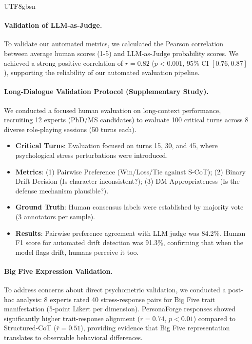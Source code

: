\documentclass[11pt]{article}
\begin{document}
\begin{CJK*}{UTF8}{gbsn}
\paragraph{Validation of LLM-as-Judge.} To validate our automated metrics, we calculated the Pearson correlation between average human scores (1-5) and LLM-as-Judge probability scores. We achieved a strong positive correlation of \textbf{$r=0.82$} ($p < 0.001$, 95\% CI $[0.76, 0.87]$), supporting the reliability of our automated evaluation pipeline.

\paragraph{Long-Dialogue Validation Protocol (Supplementary Study).}
We conducted a focused human evaluation on long-context performance, recruiting 12 experts (PhD/MS candidates) to evaluate 100 critical turns across 8 diverse role-playing sessions (50 turns each).
\begin{itemize}
    \item \textbf{Critical Turns}: Evaluation focused on turns 15, 30, and 45, where psychological stress perturbations were introduced.
    \item \textbf{Metrics}: (1) Pairwise Preference (Win/Loss/Tie against S-CoT); (2) Binary Drift Decision (Is character inconsistent?); (3) DM Appropriateness (Is the defense mechanism plausible?).
    \item \textbf{Ground Truth}: Human consensus labels were established by majority vote (3 annotators per sample).
    \item \textbf{Results}: Pairwise preference agreement with LLM judge was 84.2\%. Human F1 score for automated drift detection was 91.3\%, confirming that when the model flags drift, humans perceive it too.
\end{itemize}

\paragraph{Big Five Expression Validation.} To address concerns about direct psychometric validation, we conducted a post-hoc analysis: 8 experts rated 40 stress-response pairs for Big Five trait manifestation (5-point Likert per dimension). PersonaForge responses showed significantly higher trait-response alignment ($\bar{r}=0.74$, $p<0.01$) compared to Structured-CoT ($\bar{r}=0.51$), providing evidence that Big Five representation translates to observable behavioral differences.


\end{CJK*}
\end{document}
